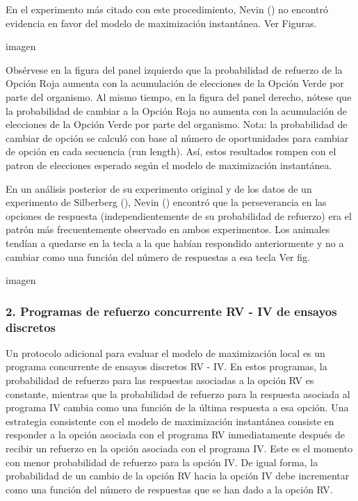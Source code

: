 \documentclass[
  letterpaper,
]{book}
\begin{document}
En el experimento más citado con este procedimiento, Nevin () no
encontró evidencia en favor del modelo de maximización instantánea. Ver
Figuras.

imagen

Obsérvese en la figura del panel izquierdo que la probabilidad de
refuerzo de la Opción Roja aumenta con la acumulación de elecciones de
la Opción Verde por parte del organismo. Al mismo tiempo, en la figura
del panel derecho, nótese que la probabilidad de cambiar a la Opción
Roja no aumenta con la acumulación de elecciones de la Opción Verde por
parte del organismo. Nota: la probabilidad de cambiar de opción se
calculó con base al número de oportunidades para cambiar de opción en
cada secuencia (run length). Así, estos resultados rompen con el patron
de elecciones esperado según el modelo de maximización instantánea.

En un análisis posterior de su experimento original y de los datos de un
experimento de Silberberg (), Nevin () encontró que la perseverancia en
las opciones de respuesta (independientemente de su probabilidad de
refuerzo) era el patrón más frecuentemente observado en ambos
experimentos. Los animales tendían a quedarse en la tecla a la que
habían respondido anteriormente y no a cambiar como una función del
número de respuestas a esa tecla Ver fig.

imagen

\subsubsection{2. Programas de refuerzo concurrente RV - IV de ensayos
discretos}\label{programas-de-refuerzo-concurrente-rv---iv-de-ensayos-discretos}

Un protocolo adicional para evaluar el modelo de maximización local es
un programa concurrente de ensayos discretos RV - IV. En estos
programas, la probabilidad de refuerzo para las respuestas asociadas a
la opción RV es constante, mientras que la probabilidad de refuerzo para
la respuesta asociada al programa IV cambia como una función de la
última respuesta a esa opción. Una estrategia consistente con el modelo
de maximización instantánea consiste en responder a la opción asociada
con el programa RV inmediatamente después de recibir un refuerzo en la
opción asociada con el programa IV. Este es el momento con menor
probabilidad de refuerzo para la opción IV. De igual forma, la
probabilidad de un cambio de la opción RV hacia la opción IV debe
incrementar como una función del número de respuestas que se han dado a
la opción RV.
\end{document}
